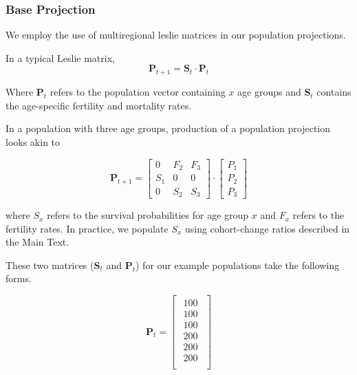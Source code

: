 \documentclass[12pt]{article}
\begin{document}
\hypertarget{base-projection}{%
\subsubsection{Base Projection}\label{base-projection}}

We employ the use of multiregional leslie matrices in our population
projections.

In a typical Leslie matrix, \begin{equation}
    \mathbf{P}_{t+1} = \mathbf{S}_t \cdot \mathbf{P}_t \label{eq:lesliematrix_base} \tag{5} \nonumber
\end{equation}

Where \(\mathbf{P}_t\) refers to the population vector containing \(x\)
age groups and \(\mathbf{S}_t\) contains the age-specific fertility and
mortality rates.

In a population with three age groups, production of a population
projection looks akin to

\begin{equation}
\mathbf{P}_{t+1} =
\begin{bmatrix}
    0 & F_2 & F_3 \\
    S_1 & 0 & 0 \\
    0 & S_2 & S_3
\end{bmatrix}
\cdot
\begin{bmatrix}
    P_1 \\
    P_2 \\
    P_3
\end{bmatrix}\nonumber
\end{equation}

where \(S_x\) refers to the survival probabilities for age group \(x\)
and \(F_x\) refers to the fertility rates. In practice, we populate
\(S_x\) using cohort-change ratios described in the Main Text.

These two matrices (\(\mathbf{S}_t\) and \(\mathbf{P}_t\)) for our
example populations take the following forms.

\begin{equation}
\mathbf{P}_t = 
\begin{bmatrix}
\begin{array}{c}
100 \\
100 \\
100 \\
\hline
200\\
200\\
200\\
\end{array}
\end{bmatrix} 
\end{equation}
\end{document}
